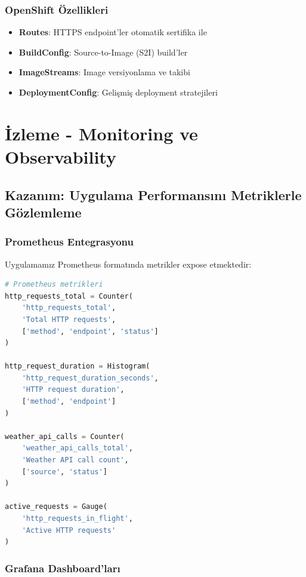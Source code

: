 \documentclass[12pt,a4paper]{article}
\begin{document}
\subsubsection{OpenShift Özellikleri}

\begin{itemize}
    \item \textbf{Routes}: HTTPS endpoint'ler otomatik sertifika ile
    \item \textbf{BuildConfig}: Source-to-Image (S2I) build'ler
    \item \textbf{ImageStreams}: Image versiyonlama ve takibi
    \item \textbf{DeploymentConfig}: Gelişmiş deployment stratejileri
\end{itemize}

\section{İzleme - Monitoring ve Observability}

\subsection{Kazanım: Uygulama Performansını Metriklerle Gözlemleme}

\subsubsection{Prometheus Entegrasyonu}

Uygulamamız Prometheus formatında metrikler expose etmektedir:

\begin{lstlisting}[language=python, caption=Metrik Tanımlamaları]
# Prometheus metrikleri
http_requests_total = Counter(
    'http_requests_total',
    'Total HTTP requests',
    ['method', 'endpoint', 'status']
)

http_request_duration = Histogram(
    'http_request_duration_seconds',
    'HTTP request duration',
    ['method', 'endpoint']
)

weather_api_calls = Counter(
    'weather_api_calls_total',
    'Weather API call count',
    ['source', 'status']
)

active_requests = Gauge(
    'http_requests_in_flight',
    'Active HTTP requests'
)
\end{lstlisting}

\subsubsection{Grafana Dashboard'ları}
\end{document}
